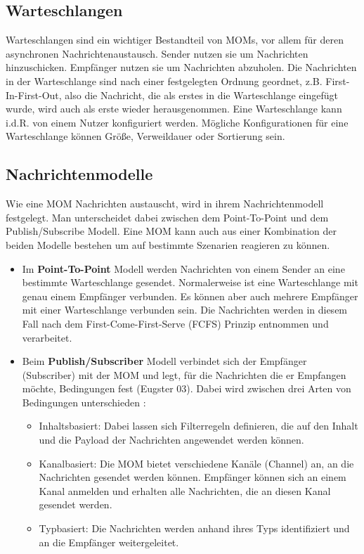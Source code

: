 \subsection{Warteschlangen}
Warteschlangen sind ein wichtiger Bestandteil von MOMs, vor allem für deren asynchronen Nachrichtenaustausch. Sender nutzen sie um Nachrichten hinzuschicken. Empfänger nutzen sie um Nachrichten abzuholen. Die Nachrichten in der Warteschlange sind nach einer festgelegten Ordnung geordnet, z.B. First-In-First-Out, also die Nachricht, die als erstes in die Warteschlange eingefügt wurde, wird auch als erste wieder herausgenommen. Eine Warteschlange kann i.d.R. von einem Nutzer konfiguriert werden. Mögliche Konfigurationen für eine Warteschlange können Größe, Verweildauer oder Sortierung sein.

\subsection{Nachrichtenmodelle}
\label{sec:nachrichtenmodelle}
Wie eine MOM Nachrichten austauscht, wird in ihrem Nachrichtenmodell festgelegt. Man unterscheidet dabei zwischen dem Point-To-Point und dem Publish/Subscribe Modell. Eine MOM kann auch aus einer Kombination der beiden Modelle bestehen um auf bestimmte Szenarien reagieren zu können.
\begin{itemize}
\item Im \textbf{Point-To-Point} Modell werden Nachrichten von einem Sender an eine bestimmte  Warteschlange gesendet. Normalerweise ist eine Warteschlange mit genau einem Empfänger verbunden. Es können aber auch mehrere Empfänger mit einer Warteschlange verbunden sein. Die Nachrichten werden in diesem Fall nach dem First-Come-First-Serve (FCFS) Prinzip entnommen und verarbeitet. 
\item Beim \textbf{Publish/Subscriber} Modell verbindet sich der Empfänger (Subscriber) mit der MOM und legt, für die Nachrichten die er Empfangen möchte, Bedingungen fest (Eugster 03). Dabei wird zwischen drei Arten von Bedingungen unterschieden \cite{Rathfelder2013}:
\begin{itemize}
    \item Inhaltsbasiert: Dabei lassen sich Filterregeln definieren, die auf den Inhalt und die Payload der Nachrichten angewendet werden können.
    \item Kanalbasiert: Die MOM bietet verschiedene Kanäle (Channel) an, an die Nachrichten gesendet werden können. Empfänger können sich an einem Kanal anmelden und erhalten alle Nachrichten, die an diesen Kanal gesendet werden.
    \item Typbasiert: Die Nachrichten werden anhand ihres Typs identifiziert und an die Empfänger weitergeleitet.
\end{itemize}
\end{itemize}


